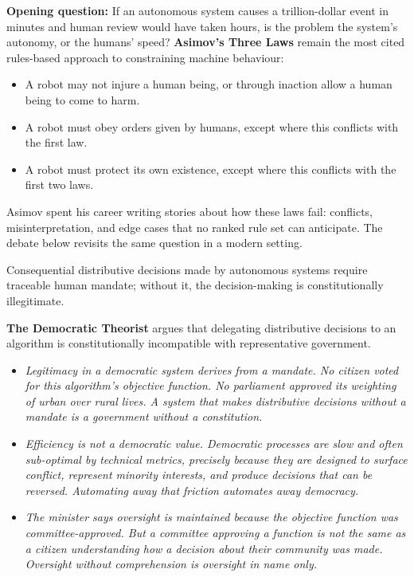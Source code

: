 \medskip
\noindent \textbf{Opening question:} If an autonomous system causes a
trillion-dollar event in minutes and human review would have taken hours,
is the problem the system's autonomy, or the humans' speed?
\medskip
\noindent\textbf{Asimov's Three Laws}\cite{asimov1950robot} remain the
most cited rules-based approach to constraining machine behaviour:
\begin{itemize}
    \item A robot may not injure a human being, or through inaction allow a human being to come to harm.
    \item A robot must obey orders given by humans, except where this conflicts with the first law.
    \item A robot must protect its own existence, except where this conflicts with the first two laws.
\end{itemize}
Asimov spent his career writing stories about how these laws fail:
conflicts, misinterpretation, and edge cases that no ranked rule set
can anticipate. The debate below revisits the same question in a
modern setting.

\quad Consequential distributive
decisions made by autonomous systems require traceable human mandate;
without it, the decision-making is constitutionally illegitimate.
\vspace{1.5em}


\medskip
\noindent\textbf{The Democratic Theorist} argues that delegating distributive
    decisions to an algorithm is constitutionally incompatible with representative government.
    \begin{itemize}
        \item \textit{Legitimacy in a democratic system derives from a
        mandate. No citizen voted for this algorithm's objective function.
        No parliament approved its weighting of urban over rural lives.
        A system that makes distributive decisions without a mandate is a
        government without a constitution.}
        \item \textit{Efficiency is not a democratic value. Democratic
        processes are slow and often sub-optimal by technical metrics,
        precisely because they are designed to surface conflict, represent
        minority interests, and produce decisions that can be reversed.
        Automating away that friction automates away democracy.}
        \item \textit{The minister says oversight is maintained because the
        objective function was committee-approved. But a committee approving
        a function is not the same as a citizen understanding how a decision
        about their community was made. Oversight without comprehension is
        oversight in name only.}
    \end{itemize}

